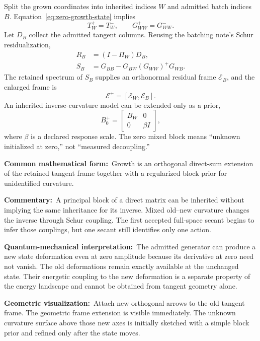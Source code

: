 \documentclass[10pt,twocolumn]{article}
\newcommand{\form}[1]{\par\noindent\textbf{Common mathematical form:}\ #1\par}
\newcommand{\commentary}[1]{\par\noindent\textbf{Commentary:}\ #1\par}
\newcommand{\phys}[1]{\par\noindent\textbf{Quantum-mechanical interpretation:}\ #1\par}
\newcommand{\geom}[1]{\par\noindent\textbf{Geometric visualization:}\ \textcolor{teal!70!black}{#1}\par}
\begin{document}
Split the grown coordinates into inherited indices \(W\) and admitted batch
indices \(B\). Equation~\eqref{eq:zero-growth-state} implies
\begin{equation}
T^+_W=T^-_W,
\qquad
G^+_{WW}=G^-_{WW}.
\label{eq:exact-old-block}
\end{equation}
Let \(D_B\) collect the admitted tangent columns. Reusing the batching note's
Schur residualization,
\begin{align}
R_B&=(I-\Pi_W)D_B,
\label{eq:growth-residual}\\
S_B&=G_{BB}-G_{BW}(G_{WW})^+G_{WB}.
\label{eq:growth-schur-gram}
\end{align}
The retained spectrum of \(S_B\) supplies an orthonormal residual frame
\(\mathcal E_B\), and the enlarged frame is
\begin{equation}
\mathcal E^+=[\mathcal E_W,\mathcal E_B].
\label{eq:enlarged-frame}
\end{equation}
An inherited inverse-curvature model can be extended only as a prior,
\begin{equation}
B_0^+
=\begin{bmatrix}
B_W&0\\
0&\beta I
\end{bmatrix},
\label{eq:growth-curvature-prior}
\end{equation}
where \(\beta\) is a declared response scale. The zero mixed block means
``unknown initialized at zero,'' not ``measured decoupling.''

\form{Growth is an orthogonal direct-sum extension of the retained tangent
frame together with a regularized block prior for unidentified curvature.}

\commentary{A principal block of a direct matrix can be inherited without
implying the same inheritance for its inverse. Mixed old--new curvature changes
the inverse through Schur coupling. The first accepted full-space secant begins
to infer those couplings, but one secant still identifies only one action.}

\phys{The admitted generator can produce a new state deformation even at zero
amplitude because its derivative at zero need not vanish. The old deformations
remain exactly available at the unchanged state. Their energetic coupling to
the new deformation is a separate property of the energy landscape and cannot
be obtained from tangent geometry alone.}

\geom{Attach new orthogonal arrows to the old tangent frame. The geometric
frame extension is visible immediately. The unknown curvature surface above
those new axes is initially sketched with a simple block prior and refined only
after the state moves.}
\end{document}
